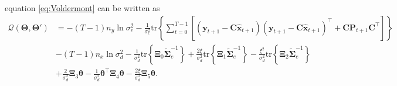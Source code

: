 \documentclass[]{article}
\begin{document}
equation \ref{eq:Voldermont} can be written as
\begin{align}\label{eq:VoldermontwitXivariables}
 \mathcal Q(\boldsymbol \Theta,\boldsymbol\Theta')&=-(T-1)n_y\ln \sigma_{\epsilon}^2-\frac{1}{\sigma_{\epsilon}^2}\mathrm{tr}\left\lbrace\boldsymbol\sum_{t=0}^{T-1}\left[ (\mathbf y_{t+1}-\mathbf C\mathbf{\hat{x}}_{t+1}) (\mathbf y_{t+1}-\mathbf C\mathbf{\hat{x}}_{t+1})^\top+\mathbf C \mathbf P_{t+1}\mathbf C^\top\right] \right\rbrace\nonumber \\
&-(T-1)n_x\ln\sigma_d^2-\frac{1}{\sigma_d^2}\mathrm{tr}\left\lbrace \boldsymbol\Xi_{0} \tilde{\boldsymbol\Sigma}_e^{-1}\right\rbrace +\frac{2\xi}{\sigma_d^2} \mathrm{tr}\left\lbrace \boldsymbol\Xi_{1} \tilde{\boldsymbol\Sigma}_e^{-1}\right\rbrace -  \frac{\xi^2}{\sigma_d^2}\mathrm{tr} \left\lbrace\boldsymbol\Xi_{2}\tilde{\boldsymbol\Sigma}_e^{-1} \right\rbrace 
 \nonumber \\
&+\frac{2}{\sigma_d^2}\boldsymbol\Xi_{3}\boldsymbol\theta-\frac{1}{\sigma_d^2}\boldsymbol\theta^\top \boldsymbol\Xi_{4}\boldsymbol\theta-\frac{2\xi}{\sigma_d^2}\boldsymbol \Xi_{5} \boldsymbol\theta.
\end{align}
\end{document}
